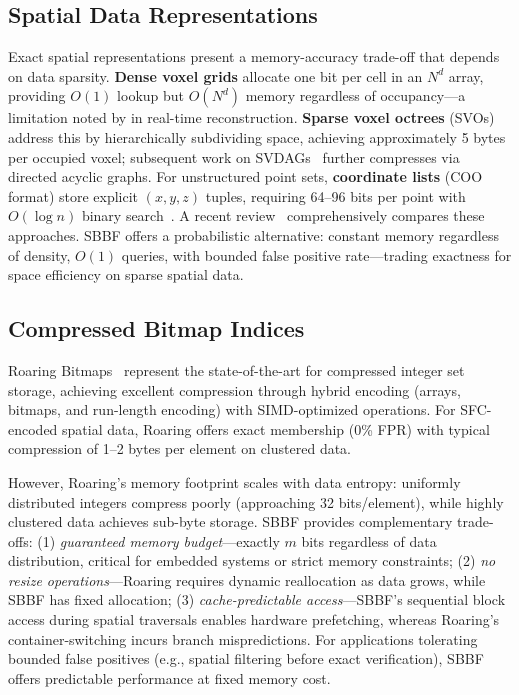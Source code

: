 \documentclass[conference,a4paper]{IEEEtran}
\begin{document}
\subsection{Spatial Data Representations}
Exact spatial representations present a memory-accuracy trade-off that depends on data sparsity. \textbf{Dense voxel grids} allocate one bit per cell in an $N^d$ array, providing $O(1)$ lookup but $O(N^d)$ memory regardless of occupancy---a limitation noted by \citet{Niessner2013} in real-time reconstruction. \textbf{Sparse voxel octrees} (SVOs)~\citep{Laine2010} address this by hierarchically subdividing space, achieving approximately 5 bytes per occupied voxel; subsequent work on SVDAGs~\citep{Kampe2013} further compresses via directed acyclic graphs. For unstructured point sets, \textbf{coordinate lists} (COO format) store explicit $(x,y,z)$ tuples, requiring 64--96 bits per point with $O(\log n)$ binary search~\citep{Saad1994}. A recent review~\citep{Nguyen2021} comprehensively compares these approaches. SBBF offers a probabilistic alternative: constant memory regardless of density, $O(1)$ queries, with bounded false positive rate---trading exactness for space efficiency on sparse spatial data.

\subsection{Compressed Bitmap Indices}
Roaring Bitmaps~\citep{Lemire2018Roaring} represent the state-of-the-art for compressed integer set storage, achieving excellent compression through hybrid encoding (arrays, bitmaps, and run-length encoding) with SIMD-optimized operations. For SFC-encoded spatial data, Roaring offers exact membership (0\% FPR) with typical compression of 1--2 bytes per element on clustered data.

However, Roaring's memory footprint scales with data entropy: uniformly distributed integers compress poorly (approaching 32 bits/element), while highly clustered data achieves sub-byte storage. SBBF provides complementary trade-offs: (1) \emph{guaranteed memory budget}---exactly $m$ bits regardless of data distribution, critical for embedded systems or strict memory constraints; (2) \emph{no resize operations}---Roaring requires dynamic reallocation as data grows, while SBBF has fixed allocation; (3) \emph{cache-predictable access}---SBBF's sequential block access during spatial traversals enables hardware prefetching, whereas Roaring's container-switching incurs branch mispredictions. For applications tolerating bounded false positives (e.g., spatial filtering before exact verification), SBBF offers predictable performance at fixed memory cost.
\end{document}
